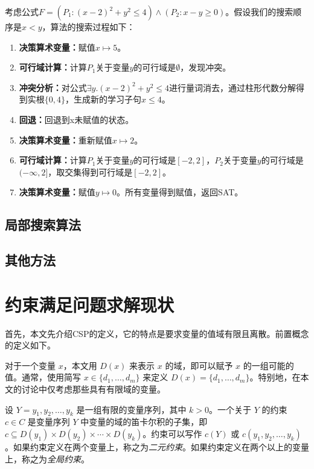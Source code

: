 \begin{example}
考虑公式$F=(P_1: (x-2)^2 + y^2 \le 4) \wedge (P_2: x - y \ge 0)$。假设我们的搜索顺序是$x < y$，算法的搜索过程如下：
\begin{enumerate}
    \item \textbf{决策算术变量：}赋值$x \mapsto 5$。
    \item \textbf{可行域计算：}计算$P_1$关于变量$y$的可行域是$\emptyset$，发现冲突。
    \item \textbf{冲突分析：}对公式$\exists y. (x-2)^2 + y^2 \le 4$进行量词消去，通过柱形代数分解得到实根$\{0, 4\}$，生成新的学习子句$x \le 4$。
    \item \textbf{回退：}回退到x未赋值的状态。
    \item \textbf{决策算术变量：}重新赋值$x \mapsto 2$。
    \item \textbf{可行域计算：}计算$P_1$关于变量$y$的可行域是$[-2, 2]$，$P_2$关于变量$y$的可行域是$(-\infty, 2]$，取交集得到可行域是$[-2, 2]$。
    \item \textbf{决策算术变量：}赋值$y \mapsto 0$。所有变量得到赋值，返回SAT。
\end{enumerate}
\label{ex:nlsat}
\end{example}

\subsection{局部搜索算法}


\subsection{其他方法}


\section{约束满足问题求解现状}

首先，本文先介绍CSP的定义，它的特点是要求变量的值域有限且离散。前置概念的定义如下。

对于一个变量 $x$，本文用 $D(x)$ 来表示 $x$ 的域，即可以赋予 $x$ 的一组可能的值。通常，使用简写 $x \in \{d_1, \dots, d_m\}$ 来定义 $D(x) = \{d_1, \dots, d_m\}$。特别地，在本文的讨论中仅考虑那些具有有限域的变量。

设 $Y = y_1, y_2, \dots, y_k$ 是一组有限的变量序列，其中 $k > 0$。一个关于 $Y$ 的约束 $c \in C$ 是变量序列 $Y$ 中变量的域的笛卡尔积的子集，即 $c \subseteq D(y_1) \times D(y_2) \times \cdots \times D(y_k)$。约束可以写作 $c(Y)$ 或 $c(y_1, y_2, \dots, y_k)$。如果约束定义在两个变量上，称之为\textit{二元约束}。如果约束定义在两个以上的变量上，称之为\textit{全局约束}。

